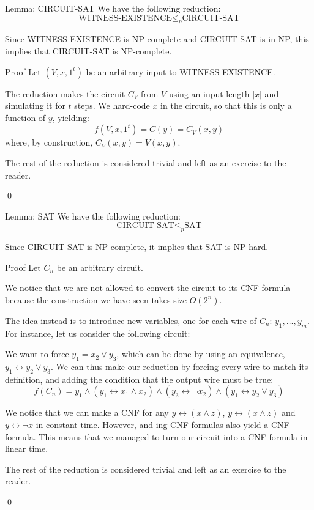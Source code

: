 \documentclass[a4paper]{article}
\begin{document}
\begin{parag}{Lemma: CIRCUIT-SAT}
    We have the following reduction: 
    \[\text{WITNESS-EXISTENCE} \leq_p \text{CIRCUIT-SAT}\]
    
    Since WITNESS-EXISTENCE is NP-complete and CIRCUIT-SAT is in NP, this implies that CIRCUIT-SAT is NP-complete.

    \begin{subparag}{Proof}
        Let $\left(V, x, 1^t\right)$ be an arbitrary input to WITNESS-EXISTENCE.

        The reduction makes the circuit $C_V$ from $V$ using an input length $\left|x\right|$ and simulating it for $t$ steps. We hard-code $x$ in the circuit, so that this is only a function of $y$, yielding:
        \[f\left(V, x, 1^t\right) = C\left(y\right) = C_V\left(x, y\right)\]
        where, by construction, $C_V\left(x, y\right) = V\left(x, y\right)$.

        The rest of the reduction is considered trivial and left as an exercise to the reader.

        \qed
    \end{subparag}
\end{parag}


\begin{parag}{Lemma: SAT}
    We have the following reduction:
    \[\text{CIRCUIT-SAT} \leq_p \text{SAT}\]

    Since CIRCUIT-SAT is NP-complete, it implies that SAT is NP-hard.

    \begin{subparag}{Proof}
        Let $C_n$ be an arbitrary circuit.

        We notice that we are not allowed to convert the circuit to its CNF formula because the construction we have seen takes size $O\left(2^n\right)$.

        The idea instead is to introduce new variables, one for each wire of $C_n$: $y_1, \ldots, y_m$. For instance, let us consider the following circuit:

        We want to force $y_1 = x_2 \lor y_3$, which can be done by using an equivalence, $y_1 \leftrightarrow y_2 \lor y_3$. We can thus make our reduction by forcing every wire to match its definition, and adding the condition that the output wire must be true:
        \[f\left(C_n\right) = y_1 \land \left(y_1 \leftrightarrow x_1 \land x_2\right) \land \left(y_3 \leftrightarrow \lnot x_2\right) \land \left(y_1 \leftrightarrow y_2 \lor y_3\right)\]
        
        We notice that we can make a CNF for any $y \leftrightarrow \left(x \land z\right)$, $y \leftrightarrow \left(x \land z\right)$ and $y \leftrightarrow \lnot x$ in constant time. However, and-ing CNF formulas also yield a CNF formula. This means that we managed to turn our circuit into a CNF formula in linear time.

        The rest of the reduction is considered trivial and left as an exercise to the reader.
        
        \qed
    \end{subparag}
\end{parag}
\end{document}
